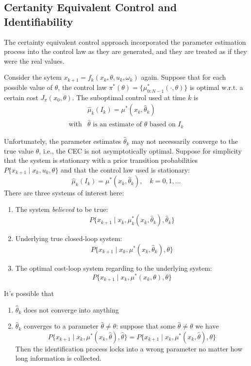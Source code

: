 \subsection{Certanity Equivalent Control and Identifiability}
The certainty equivalent control approach incorporated the parameter estimation process into the control law as they are generated, and they are treated as if they were the real values.

Consider the sytem $x_{k+1}=f_k(x_k,\theta,u_k,\omega_k)$ again.
Suppose that for each possible value of $\theta$, the control law $\pi^*(\theta)=\{\mu_{0:N-1}^*(\cdot,\theta)\}$ is optimal w.r.t. a certain cost $J_{\pi}(x_0,\theta)$.
The suboptimal control used at time $k$ is 
\[
\begin{array}{ll}
&\hat{\mu}_k(I_k) = \mu^*(x_k,\hat{\theta}_k)\\
\text{with}&\hat{\theta}\text{ is an estimate of $\theta$ based on $I_k$}
\end{array}
\]

Unfortunately, the parameter estimates $\hat{\theta}_k$ may not necessarily converge to the true value $\theta$, i.e., the CEC is not asymptotically optimal.
Suppose for simplicity that the system is stationary with a prior transition probabilities $P\{x_{k+1}\mid x_k,u_k,\theta\}$ and that the control law used is stationary:
\[
\hat{\mu}_k(I_k) = \mu^*(x_k,\hat{\theta}_k),\quad
k=0,1,\dots
\]
There are three systems of interest here:
\begin{enumerate}
\item
The system \emph{believed} to be true:
\[
P\{x_{k+1}\mid x_k,\mu_k^*(x_k,\hat{\theta}_k),\hat{\theta}_k\}
\]
\item
Underlying true closed-loop system:
\[
P\{x_{k+1}\mid x_k,\mu^*(x_k,\hat{\theta}_k),\theta\}
\]
\item
The optimal cost-loop system regarding to the underlying system:
\[
P\{x_{k+1}\mid x_k,\mu^*(x_k,\theta),\theta\}
\]
\end{enumerate}
It's possible that
\begin{enumerate}
\item
$\hat{\theta}_k$ does not converge into anything
\item
$\hat{\theta}_k$ converges to a parameter $\hat{\theta}\ne\theta$:
suppose that some $\hat{\theta}\ne\theta$ we have
\[
P\{x_{k+1}\mid x_k,\mu^*(x_k,\hat{\theta}),\hat{\theta}\}
=
P\{x_{k+1}\mid x_k,\mu^*(x_k,\hat{\theta}),{\theta}\}
\]
Then the identification process locks into a wrong parameter no matter how long information is collected.
\end{enumerate}

